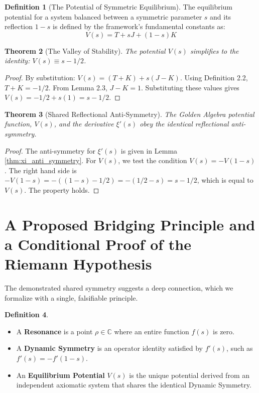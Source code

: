 \documentclass{article}
\theoremstyle{plain}
\newtheorem{theorem}{Theorem}[section]
\theoremstyle{definition}
\newtheorem{definition}[theorem]{Definition}
\theoremstyle{remark}
\begin{document}
\begin{definition}[The Potential of Symmetric Equilibrium]
The equilibrium potential for a system balanced between a symmetric parameter $s$ and its reflection $1-s$ is defined by the framework's fundamental constants as:
$$V(s) = T + sJ + (1-s)K$$
\end{definition}

\begin{theorem}[The Valley of Stability]
The potential $V(s)$ simplifies to the identity: $V(s) \equiv s - 1/2$.
\end{theorem}
\begin{proof}
By substitution: $V(s) = (T+K) + s(J-K)$. Using Definition 2.2, $T+K = -1/2$. From Lemma 2.3, $J-K=1$. Substituting these values gives $V(s) = -1/2 + s(1) = s - 1/2$.
\end{proof}

\begin{theorem}[Shared Reflectional Anti-Symmetry]
The Golden Algebra potential function, $V(s)$, and the derivative $\xi'(s)$ obey the identical reflectional anti-symmetry.
\end{theorem}
\begin{proof}
The anti-symmetry for $\xi'(s)$ is given in Lemma \ref{thm:xi_anti_symmetry}. For $V(s)$, we test the condition $V(s) = -V(1-s)$. The right hand side is $-V(1-s) = -((1-s) - 1/2) = -(1/2 - s) = s - 1/2$, which is equal to $V(s)$. The property holds.
\end{proof}

\section{A Proposed Bridging Principle and a Conditional Proof of the Riemann Hypothesis}
The demonstrated shared symmetry suggests a deep connection, which we formalize with a single, falsifiable principle.

\begin{definition}
\begin{itemize}
    \item A \textbf{Resonance} is a point $\rho \in \mathbb{C}$ where an entire function $f(s)$ is zero.
    \item A \textbf{Dynamic Symmetry} is an operator identity satisfied by $f'(s)$, such as $f'(s) = -f'(1-s)$.
    \item An \textbf{Equilibrium Potential} $V(s)$ is the unique potential derived from an independent axiomatic system that shares the identical Dynamic Symmetry.
\end{itemize}
\end{definition}
\end{document}
